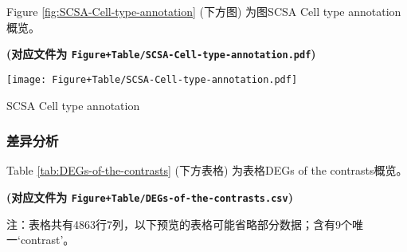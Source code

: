 \documentclass[
]{article}
\newenvironment{Shaded}{\begin{snugshade}}{\end{snugshade}}
\newcommand{\ControlFlowTok}[1]{\textcolor[rgb]{0.13,0.29,0.53}{\textbf{#1}}}
\newcommand{\DataTypeTok}[1]{\textcolor[rgb]{0.13,0.29,0.53}{#1}}
\newcommand{\KeywordTok}[1]{\textcolor[rgb]{0.13,0.29,0.53}{\textbf{#1}}}
\newcommand{\NormalTok}[1]{#1}
\newcommand{\OperatorTok}[1]{\textcolor[rgb]{0.81,0.36,0.00}{\textbf{#1}}}
\newcommand{\StringTok}[1]{\textcolor[rgb]{0.31,0.60,0.02}{#1}}
\begin{document}
Figure \ref{fig:SCSA-Cell-type-annotation} (下方图) 为图SCSA Cell type annotation概览。

\textbf{(对应文件为 \texttt{Figure+Table/SCSA-Cell-type-annotation.pdf})}

\def\@captype{figure}
\begin{center}
\texttt{[image: Figure+Table/SCSA-Cell-type-annotation.pdf]}
\caption{SCSA Cell type annotation}\label{fig:SCSA-Cell-type-annotation}
\end{center}

\hypertarget{ux5deeux5f02ux5206ux6790}{%
\subsubsection{差异分析}\label{ux5deeux5f02ux5206ux6790}}

\begin{Shaded}
\end{Shaded}

Table \ref{tab:DEGs-of-the-contrasts} (下方表格) 为表格DEGs of the contrasts概览。

\textbf{(对应文件为 \texttt{Figure+Table/DEGs-of-the-contrasts.csv})}

\begin{center}\begin{tcolorbox}[colback=gray!10, colframe=gray!50, width=0.9\linewidth, arc=1mm, boxrule=0.5pt]注：表格共有4863行7列，以下预览的表格可能省略部分数据；含有9个唯一`contrast'。
\end{tcolorbox}
\end{center}
\end{document}
